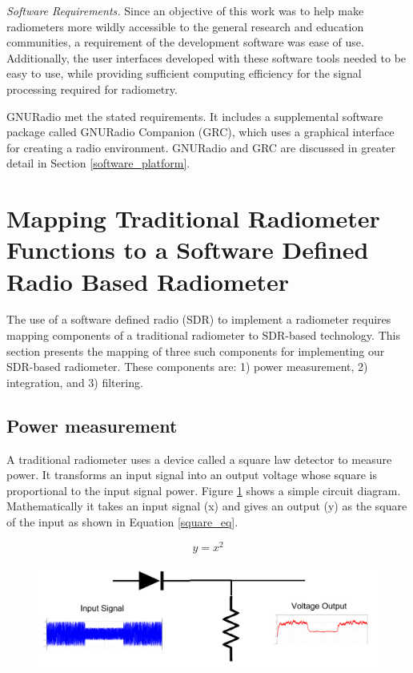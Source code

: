 \emph{Software Requirements.}  Since an objective of this work was to help make radiometers more wildly accessible to the general research and education communities, a requirement of the development software was ease of use.  Additionally, the user interfaces developed with these software tools needed to be easy to use, while providing sufficient computing efficiency for the signal processing required for radiometry.

GNURadio met the stated requirements.  It includes a supplemental software package called GNURadio Companion (GRC), which uses a graphical interface for creating a radio environment.  GNURadio and GRC are discussed in greater detail in Section \ref{software_platform}.

\section{Mapping Traditional Radiometer Functions to a Software Defined Radio Based Radiometer}

The use of a software defined radio (SDR) to implement a radiometer requires mapping components of a traditional radiometer to SDR-based technology.  This section presents the mapping of three such components for implementing our SDR-based radiometer.  These components are:  1) power measurement, 2) integration, and 3) filtering.

\subsection{Power measurement}

A traditional radiometer uses a device called a square law detector to measure power.  It transforms an input signal into an output voltage whose square is proportional to the input signal power.  Figure \ref{square_law_simple} shows a simple circuit diagram.  Mathematically it takes an input signal (x) and gives an output (y) as the square of the input as shown in Equation \ref{square_eq}.

\begin{equation}\label{square_eq}
y = x^2
\end{equation}

{\begin{figure}[h!tb] 
\centering
\includegraphics[width=17cm]{Images/square_law.pdf}
\label{square_law_simple}
\end{figure}
}

